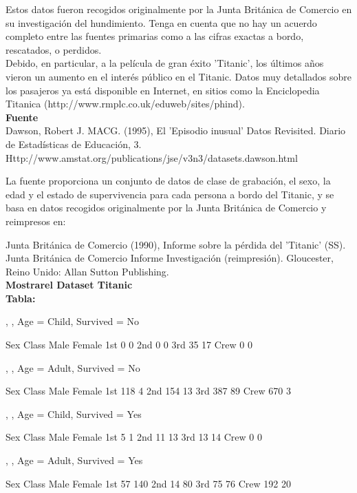 \documentclass[12pt]{report}
\begin{document}
Estos datos fueron recogidos originalmente por la Junta Británica de Comercio en su investigación del hundimiento. Tenga en cuenta que no hay un acuerdo completo entre las fuentes primarias como a las cifras exactas a bordo, rescatados, o perdidos.\\

Debido, en particular, a la película de gran éxito 'Titanic', los últimos años vieron un aumento en el interés público en el Titanic. Datos muy detallados sobre los pasajeros ya está disponible en Internet, en sitios como la Enciclopedia Titanica (http://www.rmplc.co.uk/eduweb/sites/phind).\\

\textbf{Fuente}\\

Dawson, Robert J. MACG. (1995), El 'Episodio inusual' Datos Revisited. Diario de Estadísticas de Educación, 3. Http://www.amstat.org/publications/jse/v3n3/datasets.dawson.html

La fuente proporciona un conjunto de datos de clase de grabación, el sexo, la edad y el estado de supervivencia para cada persona a bordo del Titanic, y se basa en datos recogidos originalmente por la Junta Británica de Comercio y reimpresos en:

Junta Británica de Comercio (1990), Informe sobre la pérdida del 'Titanic' (SS). Junta Británica de Comercio Informe Investigación (reimpresión). Gloucester, Reino Unido: Allan Sutton Publishing.\\

\textbf{Mostrarel Dataset Titanic}\\

\textbf{Tabla:}\\
\begin{Schunk}
\begin{Soutput}
, , Age = Child, Survived = No

      Sex
Class  Male Female
  1st     0      0
  2nd     0      0
  3rd    35     17
  Crew    0      0

, , Age = Adult, Survived = No

      Sex
Class  Male Female
  1st   118      4
  2nd   154     13
  3rd   387     89
  Crew  670      3

, , Age = Child, Survived = Yes

      Sex
Class  Male Female
  1st     5      1
  2nd    11     13
  3rd    13     14
  Crew    0      0

, , Age = Adult, Survived = Yes

      Sex
Class  Male Female
  1st    57    140
  2nd    14     80
  3rd    75     76
  Crew  192     20
\end{Soutput}
\end{Schunk}
\end{document}
